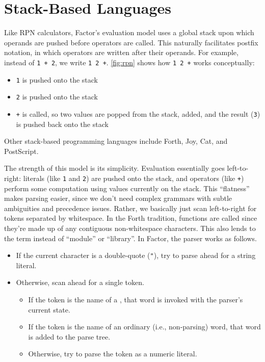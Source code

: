 \section{Stack-Based Languages}\label{sec:primer:stack-based}


Like \gls{RPN} calculators, Factor's evaluation model uses a global stack upon
which operands are pushed before operators are called.  This naturally
facilitates postfix notation, in which operators are written after their
operands.  For example, instead of \texttt{1~+~2}, we write \texttt{1~2~+}.
\vref{fig:rpn} shows how \texttt{1~2~+} works conceptually:
\begin{itemize}
  \item \texttt{1} is pushed onto the stack
  \item \texttt{2} is pushed onto the stack
  \item \texttt{+} is called, so two values are popped from the stack, added,
        and the result (\texttt{3}) is pushed back onto the stack
\end{itemize}
Other stack-based programming languages include Forth,
Joy, Cat, and PostScript.

The strength of this model is its simplicity.  Evaluation essentially goes
left-to-right: literals (like \texttt{1} and \texttt{2}) are pushed onto the
stack, and operators (like \texttt{+}) perform some computation using values
currently on the stack.  This ``flatness'' makes parsing easier, since we don't
need complex grammars with subtle ambiguities and precedence issues.  Rather,
we basically just scan left-to-right for tokens separated by whitespace.  In
the Forth tradition, functions are called  since they're made up of
any contiguous non-whitespace characters.  This also lends to the term
 instead of ``module'' or ``library''.   In Factor, the parser
works as follows.
\begin{itemize}
  \item If the current character is a double-quote (\texttt{"}), try to
        parse ahead for a string literal.
  \item Otherwise, scan ahead for a single token.
        \begin{itemize}
          \item If the token is the name of a , that word is
                invoked with the parser's current state.
          \item If the token is the name of an ordinary (i.e., non-parsing)
                word, that word is added to the parse tree.
          \item Otherwise, try to parse the token as a numeric literal.
        \end{itemize}
\end{itemize}

